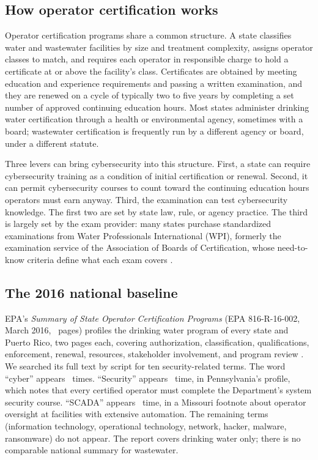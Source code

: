 \documentclass[10pt,twocolumn,letterpaper]{article}
\begin{document}
\subsection{How operator certification works}

Operator certification programs share a common structure. A state classifies water and wastewater facilities by size and treatment complexity, assigns operator classes to match, and requires each operator in responsible charge to hold a certificate at or above the facility's class. Certificates are obtained by meeting education and experience requirements and passing a written examination, and they are renewed on a cycle of typically two to five years by completing a set number of approved continuing education hours. Most states administer drinking water certification through a health or environmental agency, sometimes with a board; wastewater certification is frequently run by a different agency or board, under a different statute.

Three levers can bring cybersecurity into this structure. First, a state can require cybersecurity training as a condition of initial certification or renewal. Second, it can permit cybersecurity courses to count toward the continuing education hours operators must earn anyway. Third, the examination can test cybersecurity knowledge. The first two are set by state law, rule, or agency practice. The third is largely set by the exam provider: many states purchase standardized examinations from Water Professionals International (WPI), formerly the examination service of the Association of Boards of Certification, whose need-to-know criteria define what each exam covers \cite{wpimembers,wpintk}.

\subsection{The 2016 national baseline}

EPA's \emph{Summary of State Operator Certification Programs} (EPA 816-R-16-002, March 2016, \epaPages\ pages) profiles the drinking water program of every state and Puerto Rico, two pages each, covering authorization, classification, qualifications, enforcement, renewal, resources, stakeholder involvement, and program review \cite{epa2016}. We searched its full text by script for ten security-related terms. The word ``cyber'' appears \epaCyber\ times. ``Security'' appears \epaSecurity\ time, in Pennsylvania's profile, which notes that every certified operator must complete the Department's system security course. ``SCADA'' appears \epaScada\ time, in a Missouri footnote about operator oversight at facilities with extensive automation. The remaining terms (information technology, operational technology, network, hacker, malware, ransomware) do not appear. The report covers drinking water only; there is no comparable national summary for wastewater.
\end{document}
